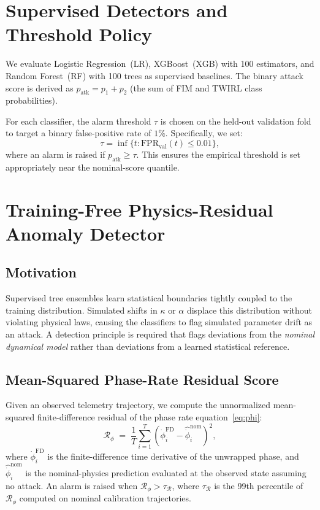 \documentclass[journal,twocolumn]{IEEEtran}
\newcommand{\Rphase}{\mathcal{R}_{\!\phi}}
\newcommand{\patk}{p_{\mathrm{atk}}}
\newcommand{\kap}{\kappa}
\begin{document}
\section{Supervised Detectors and Threshold Policy}
\label{sec:detectors}

We evaluate Logistic Regression~(LR), XGBoost~(XGB) with 100 estimators, and Random Forest~(RF) with 100 trees as supervised baselines. The binary attack score is derived as $\patk = p_1 + p_2$ (the sum of FIM and TWIRL class probabilities). 

For each classifier, the alarm threshold $\tau$ is chosen on the held-out validation fold to target a binary false-positive rate of $1\%$. Specifically, we set:
\begin{equation}
  \tau = \inf\{t : \mathrm{FPR}_\mathrm{val}(t) \leq 0.01\},
  \label{eq:threshold}
\end{equation}
where an alarm is raised if $\patk \geq \tau$. This ensures the empirical threshold is set appropriately near the nominal-score quantile.

\section{Training-Free Physics-Residual Anomaly Detector}
\label{sec:piad}

\subsection{Motivation}

Supervised tree ensembles learn statistical boundaries tightly coupled to the training distribution. Simulated shifts in $\kap$ or $\alpha$ displace this distribution without violating physical laws, causing the classifiers to flag simulated parameter drift as an attack. A detection principle is required that flags deviations from the \emph{nominal dynamical model} rather than deviations from a learned statistical reference.

\subsection{Mean-Squared Phase-Rate Residual Score}

Given an observed telemetry trajectory, we compute the unnormalized mean-squared finite-difference residual of the phase rate equation~\eqref{eq:phi}:
\begin{equation}
  \Rphase \;=\; \frac{1}{T}\sum_{i=1}^{T}
    \left(\dot{\phi}_i^{\mathrm{FD}} - \hat{\dot{\phi}}_i^{\mathrm{nom}}\right)^{\!2},
  \label{eq:residual}
\end{equation}
where $\dot{\phi}_i^{\mathrm{FD}}$ is the finite-difference time derivative of the unwrapped phase, and $\hat{\dot{\phi}}_i^{\mathrm{nom}}$ is the nominal-physics prediction evaluated at the observed state assuming no attack. An alarm is raised when $\Rphase > \tau_\mathcal{R}$, where $\tau_\mathcal{R}$ is the 99th percentile of $\Rphase$ computed on nominal calibration trajectories.
\end{document}
